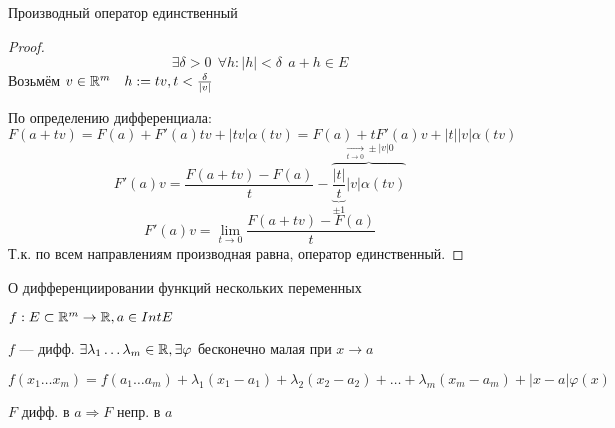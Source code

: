 \begin{lemma}
    Производный оператор единственный
\end{lemma}
\begin{proof}
    $$\exists \delta>0 \ \ \forall h : |h|<\delta \ \ a+h\in E$$
    Возьмём $v\in\mathbb{R}^m \quad h:=tv, t<\frac{\delta}{|v|}$
    
    По определению дифференциала:
    $$F(a+tv)=F(a)+F'(a)tv + |tv| \alpha(tv)=F(a)+tF'(a)v+|t||v|\alpha(tv)$$
    $$F'(a)v=\frac{F(a+tv)-F(a)}{t} - \overbrace{\underbrace{\frac{|t|}{t}}_{\pm1} |v|\alpha(tv)}^{\xrightarrow[t\to0]{}\pm |v|0}$$
    $$F'(a)v=\lim_{t\to0}\frac{F(a+tv)-F(a)}{t}$$
    Т.к. по всем направлениям производная равна, оператор единственный.
\end{proof}

\begin{remark}
    О дифференциировании функций нескольких переменных

    $f:E\subset\mathbb{R}^m \to \mathbb{R} , a\in Int E$

    $f$ --- дифф. $\exists \lambda_1 \ldots \lambda_m \in\mathbb{R}, \exists \varphi$ бесконечно малая при $x\to a$

    $$f(x_1\ldots x_m)=f(a_1\ldots a_m)+\lambda_1(x_1-a_1)+\lambda_2(x_2-a_2)+\ldots+\lambda_m(x_m-a_m)+|x-a|\varphi(x)$$
\end{remark}

\begin{remark}
    $F$ дифф. в $a \Rightarrow F$ непр. в $a$
\end{remark}

